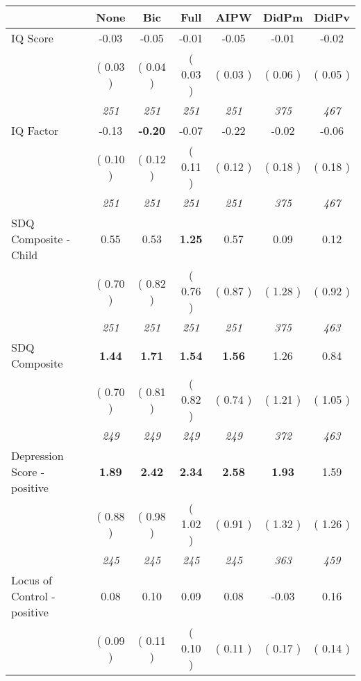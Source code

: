\begin{tabular}{l c c c c c c}
\toprule
 & None & Bic & Full & AIPW & DidPm & DidPv \\
\midrule
IQ Score &     -0.03 &     -0.05 &     -0.01 &     -0.05 &     -0.01 &     -0.02 \\
& (     0.03 ) & (     0.04 ) & (     0.03 ) & (     0.03 ) & (     0.06 ) & (     0.05 ) \\
& \textit{ 251 } & \textit{ 251 } & \textit{ 251 } & \textit{ 251 } & \textit{ 375 } & \textit{ 467 } \\
IQ Factor &     -0.13 & \textbf{     -0.20 } &     -0.07 &     -0.22 &     -0.02 &     -0.06 \\
& (     0.10 ) & (     0.12 ) & (     0.11 ) & (     0.12 ) & (     0.18 ) & (     0.18 ) \\
& \textit{ 251 } & \textit{ 251 } & \textit{ 251 } & \textit{ 251 } & \textit{ 375 } & \textit{ 467 } \\
SDQ Composite - Child &      0.55 &      0.53 & \textbf{      1.25 } &      0.57 &      0.09 &      0.12 \\
& (     0.70 ) & (     0.82 ) & (     0.76 ) & (     0.87 ) & (     1.28 ) & (     0.92 ) \\
& \textit{ 251 } & \textit{ 251 } & \textit{ 251 } & \textit{ 251 } & \textit{ 375 } & \textit{ 463 } \\
SDQ Composite & \textbf{      1.44 } & \textbf{      1.71 } & \textbf{      1.54 } & \textbf{     1.56} &      1.26 &      0.84 \\
& (     0.70 ) & (     0.81 ) & (     0.82 ) & (     0.74 ) & (     1.21 ) & (     1.05 ) \\
& \textit{ 249 } & \textit{ 249 } & \textit{ 249 } & \textit{ 249 } & \textit{ 372 } & \textit{ 463 } \\
Depression Score - positive & \textbf{      1.89 } & \textbf{      2.42 } & \textbf{      2.34 } & \textbf{     2.58} & \textbf{      1.93 } &      1.59 \\
& (     0.88 ) & (     0.98 ) & (     1.02 ) & (     0.91 ) & (     1.32 ) & (     1.26 ) \\
& \textit{ 245 } & \textit{ 245 } & \textit{ 245 } & \textit{ 245 } & \textit{ 363 } & \textit{ 459 } \\
Locus of Control - positive &      0.08 &      0.10 &      0.09 &      0.08 &     -0.03 &      0.16 \\
& (     0.09 ) & (     0.11 ) & (     0.10 ) & (     0.11 ) & (     0.17 ) & (     0.14 ) \\

\end{tabular}
